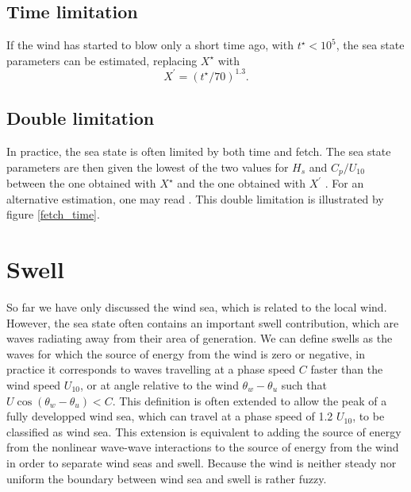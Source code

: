 \subsection{Time limitation}
If the wind has started to blow only a short time ago, with $t^\star < 10^5$, the sea state parameters 
can be estimated, replacing $X^\star$ with
\begin{equation}
X^\prime = (t^\star/70)^{1.3}. \label{eq:time_limit}
\end{equation} 

\subsection{Double limitation}
In practice, the sea state is often limited by both time and fetch. 
The sea state parameters are then given the lowest of the two values for $H_s$ and $C_p/U_{10}$ 
between the one obtained with $X^\star$ and the one obtained with $X^\prime$ \citep[see][]{CERC1977}. 
For an alternative estimation, one may read \cite{Hwang&Wang2004}. This double limitation is illustrated by figure \ref{fetch_time}.



\section{Swell}
So far we have only discussed the wind sea, which is related to the local wind. However,  
the sea state often contains an important swell contribution, which are waves radiating away from their area of generation. We can define swells as the waves for which the source 
of energy from the wind is zero or negative, in practice it corresponds to waves travelling at a phase speed $C$ faster than the wind speed $U_{10}$, or at angle relative 
to the wind $\theta_w - \theta_u$ such that $U \cos(\theta_w-\theta_u) < C$. This definition is often extended to allow the peak of a fully developped wind sea, which can 
travel at a phase speed of 1.2 $U_{10}$, to be classified as wind sea. This extension is equivalent to adding the source of energy from the nonlinear wave-wave interactions to 
the source of energy from the wind in order to separate wind seas and swell. Because the wind is neither steady nor uniform the boundary between wind sea and swell is rather 
fuzzy. 

